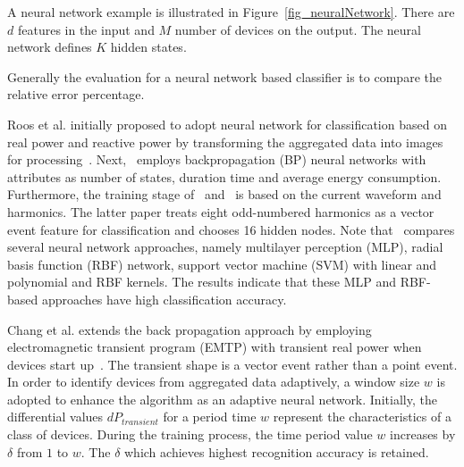 A neural network example is 
illustrated in Figure~\ref{fig_neuralNetwork}. %
There are $d$ features in the input and 
$M$ number of devices on the output. 
The neural network defines $K$ hidden states. 


Generally the evaluation for a neural network based classifier is 
to compare the relative error percentage.

Roos et al. initially proposed to adopt
neural network for classification based on real
power and reactive power by 
transforming the aggregated data into images for processing~\cite{roos1994using}.
Next,~\cite{baranski2003nonintrusive} employs backpropagation (BP)
neural networks with attributes as number of states,
duration time and average energy consumption. %
Furthermore, 
the training stage of~\cite{duan2004neural} and~\cite{srinivasan2006neural} is based on the current waveform
and harmonics. %
The latter paper treats eight odd-numbered harmonics as a vector event feature 
for classification and chooses 16 hidden nodes.
Note that~\cite{srinivasan2006neural} compares several neural network approaches, 
namely multilayer perception (MLP), radial basis function (RBF) network,
support vector machine (SVM) with linear and polynomial and
RBF kernels.
The results indicate that these MLP and RBF-based approaches have high classification accuracy. 

Chang et al. extends the back propagation approach
by employing electromagnetic transient program (EMTP) with
transient real power when devices start up~\cite{chang2008load2}. 
The transient shape is a vector event rather than a point event. 
In order to identify devices from aggregated data adaptively,
a window size %
$w$
is adopted to enhance the algorithm
as an adaptive neural network. 
Initially, the differential values $dP_{transient}$ for a period time %
$w$
represent the characteristics of a class of devices. During the training process,
the time period value %
$w$ increases by $\delta$ from $1$ to %
$w$.
The $\delta$ which achieves highest recognition accuracy is retained.


